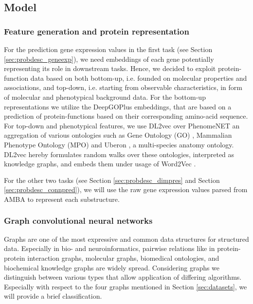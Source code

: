 \documentclass[]{article}
\renewcommand{\cite}{\citep}
\begin{document}
\subsection{Model}
\label{sec:modeldesc}

\subsubsection{Feature generation and protein representation}
\label{sec:feature_gen}
For the prediction gene expression values in the first task (see Section \ref{sec:probdesc_geneexp}), we need embeddings of each gene potentially representing its role in downstream tasks. Hence, we decided to exploit protein-function data based on both bottom-up, i.e. founded on molecular properties and associations, and top-down, i.e. starting from observable characteristics, in form of molecular and phenotypical background data. For the bottom-up representations we utilize the DeepGOPlus \cite{DeepGoPlus} embeddings, that are based on a prediction of protein-functions based on their corresponding amino-acid sequence. For top-down and phenotypical features, we use DL2vec \cite{DL2vec2020} over PhenomeNET\cite{PhenomeNET2011} an aggregation of various ontologies such as Gene Ontology (GO) \cite{GOoriginal2000, GOrecent2020}, Mammalian Phenotype Ontology (MPO) \cite{MP2009} and Uberon \cite{mungall2012uberon}, a multi-species anatomy ontology. DL2vec hereby formulates random walks over these ontologies, interpreted as knowledge graphs, and embeds them under usage of Word2Vec \cite{Word2vec2013}. 

For the other two tasks (see Section \ref{sec:probdesc_dimpres} and Section \ref{sec:probdesc_connpred}), we will use the raw gene expression values parsed from AMBA to represent each substructure.

\subsubsection{Graph convolutional neural networks}
\label{sec:graphconv}
Graphs are one of the most expressive and common data structures for structured data. Especially in bio- and neuroinformatics, pairwise relations like in protein-protein interaction graphs, molecular graphs, biomedical ontologies, and biochemical knowledge graphs are widely spread. Considering graphs we distinguish between various types that allow application of differing algorithms. Especially with respect to the four graphs mentioned in Section \ref{sec:datasets}, we will provide a brief classification.\\
\end{document}

